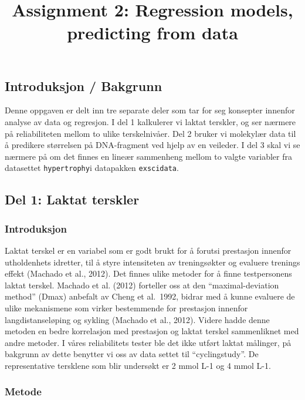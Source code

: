 \documentclass[
  letterpaper,
  DIV=11,
  numbers=noendperiod]{scrartcl}
\title{Assignment 2: Regression models, predicting from data}
\author{}
\date{}
\begin{document}
\maketitle


\subsection{Introduksjon / Bakgrunn}\label{introduksjon-bakgrunn}

Denne oppgaven er delt inn tre separate deler som tar for seg konsepter
innenfor analyse av data og regresjon. I del 1 kalkulerer vi laktat
terskler, og ser nærmere på reliabiliteten mellom to ulike
terskelnivåer. Del 2 bruker vi molekylær data til å predikere størrelsen
på DNA-fragment ved hjelp av en veileder. I del 3 skal vi se nærmere på
om det finnes en lineær sammenheng mellom to valgte variabler fra
datasettet \texttt{hypertrophy}i datapakken \texttt{exscidata}.

\subsection{Del 1: Laktat terskler}\label{del-1-laktat-terskler}

\subsubsection{Introduksjon}\label{introduksjon}

Laktat terskel er en variabel som er godt brukt for å forutsi prestasjon
innenfor utholdenhets idretter, til å styre intensiteten av
treningsøkter og evaluere trenings effekt (Machado et al., 2012). Det
finnes ulike metoder for å finne testpersonens laktat terskel. Machado
et al. (2012) forteller oss at den ``maximal-deviation method'' (Dmax)
anbefalt av Cheng et al.~1992, bidrar med å kunne evaluere de ulike
mekanismene som virker bestemmende for prestasjon innenfor
langdistanseløping og sykling (Machado et al., 2012). Videre hadde denne
metoden en bedre korrelasjon med prestasjon og laktat terskel
sammenliknet med andre metoder. I våres reliabilitets tester ble det
ikke utført laktat målinger, på bakgrunn av dette benytter vi oss av
data settet til ``cyclingstudy''. De representative tersklene som blir
undersøkt er 2 mmol L-1 og 4 mmol L-1.

\subsubsection{Metode}\label{metode}
\end{document}
